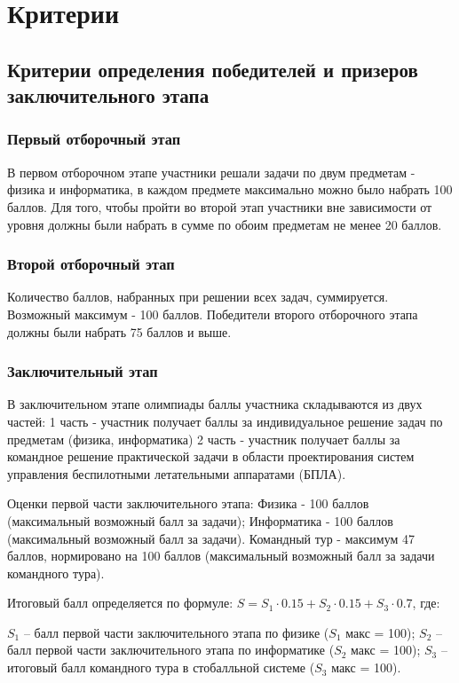 \part{Критерии}

\chapter{Критерии определения победителей и призеров заключительного этапа}
\section{Первый отборочный этап}

В первом отборочном этапе участники решали задачи по двум предметам - физика и информатика, в каждом предмете максимально можно было набрать 100 баллов. Для того, чтобы пройти во второй этап участники вне зависимости от уровня должны были набрать в сумме по обоим предметам не менее 20 баллов.

\section{Второй отборочный этап}

Количество баллов, набранных при решении всех задач, суммируется. Возможный максимум - 100 баллов. 
Победители второго отборочного этапа должны были набрать 75 баллов и выше.

\section{Заключительный этап}

В заключительном этапе олимпиады баллы участника складываются из двух частей: 1 часть - участник получает баллы за индивидуальное решение задач по предметам (физика, информатика)
2 часть - участник получает баллы за командное решение практической задачи в области проектирования систем управления беспилотными летательными аппаратами (БПЛА).

Оценки первой части заключительного этапа:
Физика - 100 баллов (максимальный возможный балл за задачи);
Информатика - 100 баллов (максимальный возможный балл за задачи).
Командный тур  - максимум 47 баллов, нормировано на 100 баллов (максимальный возможный балл за задачи командного тура).

Итоговый балл определяется по формуле: $S = S_1 \cdot 0.15 + S_2 \cdot 0.15 + S_3 \cdot 0.$7, где:

$S_1$ – балл первой части заключительного этапа по физике ($S_1$ макс = 100);
$S_2$ – балл первой части заключительного этапа по информатике ($S_2$ макс = 100);
$S_3$ – итоговый балл командного тура в стобалльной системе ($S_3$ макс = 100).

